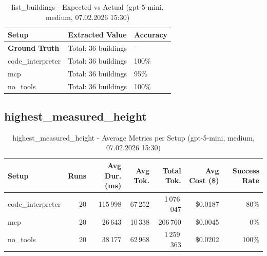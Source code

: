 \documentclass[a4paper,11pt]{article}
\begin{document}
\begin{table}[H]
\centering
\scriptsize
\caption{list\_buildings - Expected vs Actual (gpt-5-mini, medium, 07.02.2026 15:30)}
\begin{tabular}{l l l}
\toprule
Setup & Extracted Value & Accuracy \\
\midrule
\textbf{Ground Truth} & Total: 36 buildings & -- \\
\midrule
code\_interpreter & Total: 36 buildings & 100\% \\
mcp & Total: 36 buildings & 95\% \\
no\_tools & Total: 36 buildings & 100\% \\
\bottomrule
\end{tabular}
\end{table}

\clearpage

\subsection{highest\_measured\_height}

\begin{table}[H]
\centering
\scriptsize
\caption{highest\_measured\_height - Average Metrics per Setup (gpt-5-mini, medium, 07.02.2026 15:30)}
\label{tab:combined\_highest\_measured\_height\_metrics\_20260207}
\begin{tabular}{l r r r r r r}
\toprule
Setup & Runs & Avg Dur. (ms) & Avg Tok. & Total Tok. & Avg Cost (\$) & Success Rate \\
\midrule
code\_interpreter & 20 & 115\,998 & 67\,252 & 1\,076\,047 & \$0.0187 & 80\% \\
mcp & 20 & 26\,643 & 10\,338 & 206\,760 & \$0.0045 & 0\% \\
no\_tools & 20 & 38\,177 & 62\,968 & 1\,259\,363 & \$0.0202 & 100\% \\
\bottomrule
\end{tabular}
\end{table}
\end{document}
